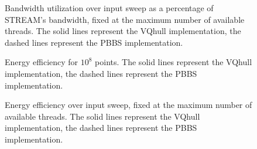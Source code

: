 \documentclass{cas-sc}
\begin{document}
\begin{figure}
  \scriptsize
  \begin{subfigure}{.333\linewidth}
    \centering
  \end{subfigure}%
  \begin{subfigure}{.333\linewidth}
    \centering
  \end{subfigure}%
  \begin{subfigure}{.333\linewidth}
    \centering
  \end{subfigure}%
  \caption{Bandwidth utilization over input sweep as a percentage of STREAM's
  bandwidth, fixed at the maximum number of available threads. The solid lines
  represent the VQhull implementation, the dashed lines represent the PBBS
  implementation.}%
\end{figure}

\begin{figure}
  \scriptsize
  \begin{subfigure}{.333\linewidth}
    \centering
  \end{subfigure}%
  \begin{subfigure}{.333\linewidth}
    \centering
  \end{subfigure}%
  \begin{subfigure}{.333\linewidth}
    \centering
  \end{subfigure}%
  \caption{Energy efficiency for $10^8$ points. The solid lines represent the
  VQhull implementation, the dashed lines represent the PBBS implementation.}%
\end{figure}

\begin{figure}
  \scriptsize
  \begin{subfigure}{.333\linewidth}
    \centering
  \end{subfigure}%
  \begin{subfigure}{.333\linewidth}
    \centering
  \end{subfigure}%
  \begin{subfigure}{.333\linewidth}
    \centering
  \end{subfigure}%
  \caption{Energy efficiency over input sweep, fixed at the maximum number of
  available threads. The solid lines represent the VQhull implementation, the
  dashed lines represent the PBBS implementation.}
\end{figure}
\end{document}
